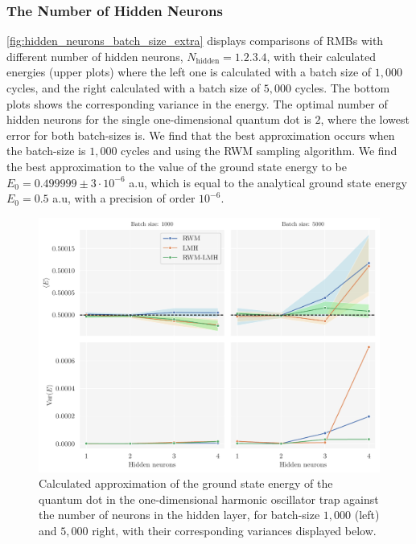 \FloatBarrier

\subsubsection*{The Number of Hidden Neurons}


\autoref{fig:hidden_neurons_batch_size_extra} displays comparisons of RMBs with different number of hidden neurons, $N_{\mathrm{hidden}}= \qty{1, 2, 3, 4}$, with their calculated energies (upper plots) where the left one is calculated with a batch size of $1,000$ cycles, and the right calculated with a batch size of $5,000$ cycles. The bottom plots shows the corresponding variance in the energy. The optimal number of hidden neurons for the single one-dimensional quantum dot is $2$, where the lowest error for both batch-sizes is. We find that the best approximation occurs when the batch-size is $1,000$ cycles and using the RWM sampling algorithm. We find the best approximation to the value of the ground state energy to be $E_0 = 0.499999\pm3\cdot10^{-6}$ a.u, which is equal to the analytical ground state energy $E_0= 0.5$ a.u, with a precision of order $10^{-6}$. 

\begin{figure}[!htb]
\begin{center}\includegraphics[width=\textwidth]{latex/figures/hidden_neurons_batch_size_extra.pdf}
\end{center}
\caption{Calculated approximation of the ground state energy of the quantum dot in the one-dimensional harmonic oscillator trap against the number of neurons in the hidden layer, for batch-size $1,000$ (left) and $5,000$ right, with their corresponding variances displayed below.}
\label{fig:hidden_neurons_batch_size_extra}
\end{figure}

